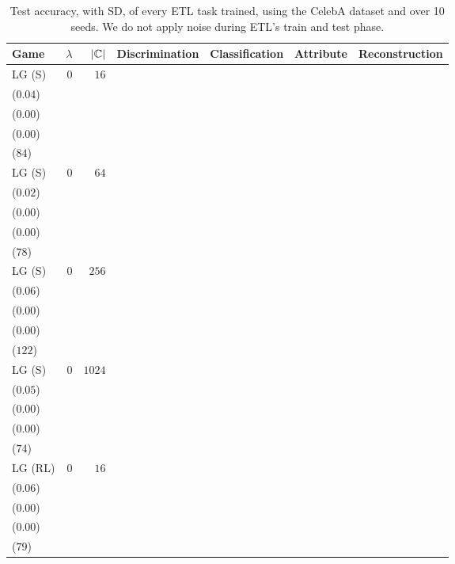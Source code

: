 \begin{table*}[t]
\linespread{0.6}\selectfont\centering
\centering
\caption{Test accuracy, with SD, of every ETL task trained, using the CelebA dataset and over 10 seeds. We do not apply noise during ETL's train and test phase.}
\label{table:etl_celeba_0_eval}
\begin{tabular}{lrrrrrr}
\toprule
Game & \(\lambda\) & \(|\mathcal{{\mathbb{C}}}|\) & \multicolumn{1}{c}{Discrimination} & \multicolumn{1}{c}{Classification} & \multicolumn{1}{c}{Attribute} & \multicolumn{1}{c}{Reconstruction} \\[1ex]
\midrule
LG {\scriptsize(S)} & \(0\) & \(16\) & \longcell{\(0.18\)\\{\tiny(\(0.04\))}} & \longcell{\(0.00\)\\{\tiny(\(0.00\))}} & \longcell{\(0.85\)\\{\tiny(\(0.00\))}} & \longcell{\(6094\)\\{\tiny(\(84\))}} \\[2.2ex]
LG {\scriptsize(S)} & \(0\) & \(64\) & \longcell{\(0.31\)\\{\tiny(\(0.02\))}} & \longcell{\(0.00\)\\{\tiny(\(0.00\))}} & \longcell{\(0.86\)\\{\tiny(\(0.00\))}} & \longcell{\(5971\)\\{\tiny(\(78\))}} \\[2.2ex]
LG {\scriptsize(S)} & \(0\) & \(256\) & \longcell{\(0.39\)\\{\tiny(\(0.06\))}} & \longcell{\(0.01\)\\{\tiny(\(0.00\))}} & \longcell{\(0.86\)\\{\tiny(\(0.00\))}} & \longcell{\(5852\)\\{\tiny(\(122\))}} \\[2.2ex]
LG {\scriptsize(S)} & \(0\) & \(1024\) & \longcell{\(0.44\)\\{\tiny(\(0.05\))}} & \longcell{\(0.01\)\\{\tiny(\(0.00\))}} & \longcell{\(0.86\)\\{\tiny(\(0.00\))}} & \longcell{\(5814\)\\{\tiny(\(74\))}} \\[2.2ex]
LG {\scriptsize(RL)} & \(0\) & \(16\) & \longcell{\(0.15\)\\{\tiny(\(0.06\))}} & \longcell{\(0.00\)\\{\tiny(\(0.00\))}} & \longcell{\(0.85\)\\{\tiny(\(0.00\))}} & \longcell{\(6110\)\\{\tiny(\(79\))}} \\[2.2ex]

\end{tabular}
\end{table*}
